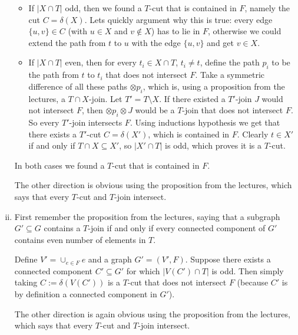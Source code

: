 \begin{exercise}{3}
\begin{enumerate}[i)]
{                \begin{itemize}
                    \item{If $|X \cap T|$ odd, then we found a $T$-cut that is
                        contained in $F$, namely the cut $C = \delta(X)$. Lets
                        quickly argument why this is true: every edge $\{u, v\}
                        \in C$ (with $u \in X$ and $v \notin X$) has to lie in
                        $F$, otherwise we could extend the path from $t$ to $u$
                        with the edge $\{u, v\}$ and get $v \in X$.}
                    \item{If $|X \cap T|$ even, then for every $t_i \in X \cap
                        T$, $t_i \not= t$, define the path $p_i$ to be the path
                        from $t$ to $t_i$ that does not intersect $F$. Take
                        a symmetric difference of all these paths
                        $\otimes p_i$, which is,
                        using a proposition from the lectures, a $T \cap
                        X$-join. Let $T' = T \setminus X$. If there existed a
                        $T'$-join $J$ would not intersect $F$, then $\otimes p_i
                        \otimes J$ would be a $T$-join that does not intersect
                        $F$. So every $T'$-join intersects $F$. Using inductions
                        hypothesis we get that there exists a $T'$-cut $C =
                        \delta(X')$, which is contained in $F$. Clearly $t \in
                        X'$ if and only if $T \cap X \subseteq X'$, so $|X'
                        \cap T|$ is odd, which proves it is a $T$-cut.
                        }
                \end{itemize}
                In both cases we found a $T$-cut that is contained in $F$.

                The other direction is obvious using the proposition from the
                lectures, which says that every $T$-cut and $T$-join intersect.}
        \item{First remember the proposition from the lectures, saying that a
            subgraph $G' \subseteq G$ contains a $T$-join if and only if every
            connected component of $G'$ contains even number of elements in $T$. 

            Define $V' = \cup_{e \in F} e$ and a graph $G' = (V', F)$. Suppose
            there exists a connected component $C' \subseteq G'$ for which
            $|V(C') \cap T|$ is odd. Then simply taking $C := \delta(V(C'))$ is
            a $T$-cut that does not intersect $F$ (because $C'$ is by definition
            a connected component in $G'$).

            The other direction is again obvious using the proposition from the
            lectures, which says that every $T$-cut and $T$-join intersect.}
    \end{enumerate}
\end{exercise}


